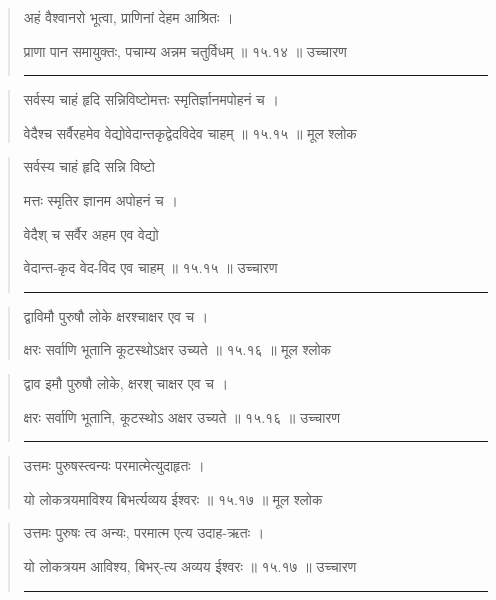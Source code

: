 \begin{quotation}

अहं वैश्वानरो भूत्वा, प्राणिनां देहम आश्रितः  ।  

प्राणा पान समायुक्तः, पचाम्य अन्नम चतुर्विधम्‌  ॥ १५.१४ ॥  उच्चारण

\noindent\rule{16cm}{0.4pt} 
\end{quotation}


\begin{quotation}

सर्वस्य चाहं हृदि सन्निविष्टोमत्तः स्मृतिर्ज्ञानमपोहनं च  ।  

वेदैश्च सर्वैरहमेव वेद्योवेदान्तकृद्वेदविदेव चाहम्‌  ॥ १५.१५ ॥  मूल श्लोक
\end{quotation}

\begin{quotation}

सर्वस्य चाहं हृदि सन्नि विष्टो

मत्तः स्मृतिर ज्ञानम अपोहनं च  ।  

वेदैश् च सर्वैर अहम एव वेद्यो 

वेदान्त-कृद वेद-विद एव चाहम्‌  ॥ १५.१५ ॥  उच्चारण

\noindent\rule{16cm}{0.4pt} 
\end{quotation}


\begin{quotation}

द्वाविमौ पुरुषौ लोके क्षरश्चाक्षर एव च  ।  

क्षरः सर्वाणि भूतानि कूटस्थोऽक्षर उच्यते  ॥ १५.१६ ॥  मूल श्लोक
\end{quotation}

\begin{quotation}

द्वाव इमौ पुरुषौ लोके, क्षरश् चाक्षर एव च  ।  

क्षरः सर्वाणि भूतानि, कूटस्थोऽ अक्षर उच्यते  ॥ १५.१६ ॥  उच्चारण

\noindent\rule{16cm}{0.4pt} 
\end{quotation}


\begin{quotation}

उत्तमः पुरुषस्त्वन्यः परमात्मेत्युदाहृतः  ।  

यो लोकत्रयमाविश्य बिभर्त्यव्यय ईश्वरः  ॥ १५.१७ ॥  मूल श्लोक
\end{quotation}

\begin{quotation}

उत्तमः पुरुषः त्व अन्यः, परमात्म एत्य उदाह-ऋतः ।  

यो लोकत्रयम आविश्य, बिभर्-त्य अव्यय ईश्वरः  ॥ १५.१७ ॥  उच्चारण

\noindent\rule{16cm}{0.4pt} 
\end{quotation}


